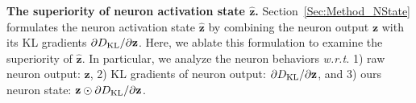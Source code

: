 \documentclass{article} \usepackage{iclr2024_conference,times}
\newcommand{\bfstart}[1]{\noindent\textbf{#1.}}
\begin{document}
\vspace{2mm}
\begin{table*}[!hb]
	\centering
	\vspace{-1.5mm}
	\caption{Performance of \texttt{NAC-UE} with different layer choices. }
	\label{table:OOD_Layer}
\end{table*}
\vspace{1.5mm}


















\bfstart{The superiority of neuron activation state $\hat{\mathbf{z}}$} Section~\ref{Sec:Method_NState} formulates the neuron activation state $\hat{\mathbf{z}}$ by combining the neuron output ${\mathbf{z}}$ with its KL gradients $\partial D_{\rm KL}/\partial \mathbf{z}$. Here, we ablate this formulation to examine the superiority of $\hat{\mathbf{z}}$. 
In particular, we analyze the neuron behaviors \textit{w.r.t.} 1) raw neuron output: ${\mathbf{z}}$, 2) KL gradients of neuron output: $\partial D_{\rm KL}/\partial \mathbf{z}$, and 3) ours neuron state: $\mathbf{z} \odot \partial D_{\rm KL}/\partial \mathbf{z}$. 
\end{document}
